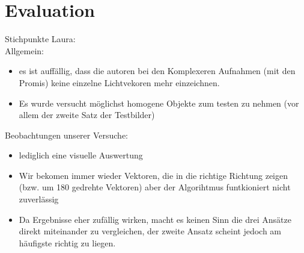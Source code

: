 \section{Evaluation} \label{sec:Evaluation}

Stichpunkte Laura:\\
Allgemein:\\
\begin{itemize}
\item es ist auffällig, dass die autoren bei den Komplexeren Aufnahmen (mit den Promis) keine einzelne Lichtvekoren mehr einzeichnen. 
\item Es wurde versucht möglichst homogene Objekte zum testen zu nehmen (vor allem der zweite Satz der Testbilder)
\end{itemize}

Beobachtungen unserer Versuche:\\
\begin{itemize}
\item lediglich eine visuelle Auswertung
\item Wir bekomen immer wieder Vektoren, die in die richtige Richtung zeigen  (bzw. um 180 gedrehte Vektoren) aber der Algorihtmus funtkioniert nicht zuverlässig
\item Da Ergebnisse eher zufällig wirken, macht es keinen Sinn die drei Ansätze direkt miteinander zu vergleichen, der zweite Ansatz scheint jedoch am häufigste richtig zu liegen.
\end{itemize}





\newpage